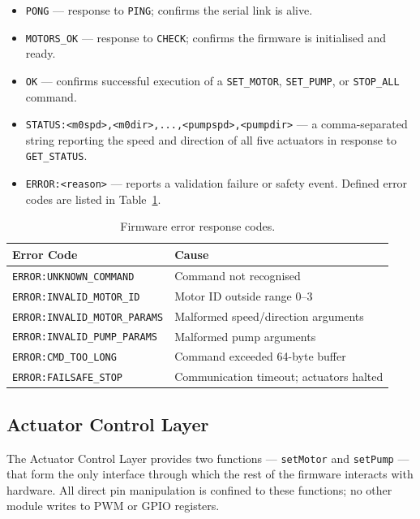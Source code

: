 \begin{itemize}
    \item \texttt{PONG} — response to \texttt{PING}; confirms
          the serial link is alive.
    \item \texttt{MOTORS\_OK} — response to \texttt{CHECK}; confirms
          the firmware is initialised and ready.
    \item \texttt{OK} — confirms successful execution of a
          \texttt{SET\_MOTOR}, \texttt{SET\_PUMP}, or
          \texttt{STOP\_ALL} command.
    \item \texttt{STATUS:<m0spd>,<m0dir>,...,<pumpspd>,<pumpdir>}
          — a comma-separated string reporting the speed and direction
          of all five actuators in response to \texttt{GET\_STATUS}.
    \item \texttt{ERROR:<reason>} — reports a validation failure or
          safety event. Defined error codes are listed in
          Table~\ref{tab:errors}.
\end{itemize}

\begin{table}[h]
\centering
\caption{Firmware error response codes.}
\label{tab:errors}
\begin{tabular}{ll}
\hline
\textbf{Error Code} & \textbf{Cause} \\
\hline
\texttt{ERROR:UNKNOWN\_COMMAND}      & Command not recognised \\
\texttt{ERROR:INVALID\_MOTOR\_ID}   & Motor ID outside range 0--3 \\
\texttt{ERROR:INVALID\_MOTOR\_PARAMS} & Malformed speed/direction arguments \\
\texttt{ERROR:INVALID\_PUMP\_PARAMS} & Malformed pump arguments \\
\texttt{ERROR:CMD\_TOO\_LONG}        & Command exceeded 64-byte buffer \\
\texttt{ERROR:FAILSAFE\_STOP}        & Communication timeout; actuators halted \\
\hline
\end{tabular}
\end{table}

\subsection{Actuator Control Layer}
\label{sec:actuator_layer}

The Actuator Control Layer provides two functions — \texttt{setMotor}
and \texttt{setPump} — that form the only interface through which the
rest of the firmware interacts with hardware. All direct pin
manipulation is confined to these functions; no other module writes to
PWM or GPIO registers.

